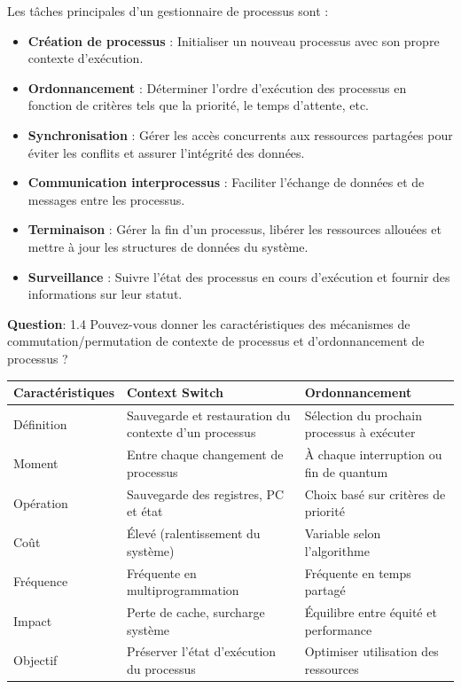 \noindent Les tâches principales d'un gestionnaire de processus sont :
\begin{itemize}
	\item \textbf{Création de processus} : Initialiser un nouveau processus avec son propre contexte d'exécution.
	\item \textbf{Ordonnancement} : Déterminer l'ordre d'exécution des processus en fonction de critères tels que la priorité, le temps d'attente, etc.
	\item \textbf{Synchronisation} : Gérer les accès concurrents aux ressources partagées pour éviter les conflits et assurer l'intégrité des données.
	\item \textbf{Communication interprocessus} : Faciliter l'échange de données et de messages entre les processus.
	\item \textbf{Terminaison} : Gérer la fin d'un processus, libérer les ressources allouées et mettre à jour les structures de données du système.
	\item \textbf{Surveillance} : Suivre l'état des processus en cours d'exécution et fournir des informations sur leur statut.
\end{itemize}

\vspace{0.5cm}

\noindent \textbf{Question}: 1.4 Pouvez-vous donner les caractéristiques des mécanismes de commutation/permutation de contexte de processus et d'ordonnancement de processus ?

\begin{center}
\setlength{\tabcolsep}{10pt}

\begin{tabular}{|p{}|p{}|p{}|}
\hline
\textbf{Caractéristiques} & \textbf{Context Switch} & \textbf{Ordonnancement} \\ \hline

Définition & Sauvegarde et restauration du contexte d'un processus & Sélection du prochain processus à exécuter \\ \hline

Moment & Entre chaque changement de processus & À chaque interruption ou fin de quantum \\ \hline

Opération & Sauvegarde des registres, PC et état & Choix basé sur critères de priorité \\ \hline

Coût & Élevé (ralentissement du système) & Variable selon l'algorithme \\ \hline

Fréquence & Fréquente en multiprogrammation & Fréquente en temps partagé \\ \hline

Impact & Perte de cache, surcharge système & Équilibre entre équité et performance \\ \hline

Objectif & Préserver l'état d'exécution du processus & Optimiser utilisation des ressources \\ \hline

\end{tabular}
\end{center}

